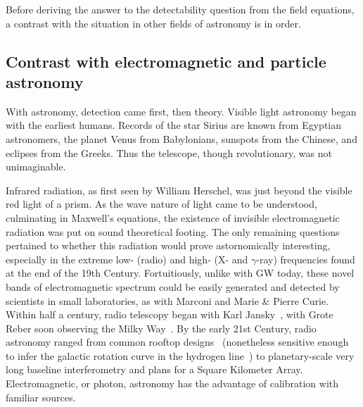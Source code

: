 Before deriving the answer to the detectability question from the field equations, a contrast with the situation in other fields of astronomy is in order.

 
        \subsection{Contrast with electromagnetic and particle astronomy}
        \label{contrast_astro}

        With astronomy, detection came first, then theory.
Visible light astronomy began with the earliest humans.
Records of the star Sirius are known from Egyptian astronomers, the planet Venus from Babylonians, sunspots from the Chinese, and eclipses from the Greeks. 
Thus the telescope, though revolutionary, was not unimaginable.

Infrared radiation, as first seen by William Herschel, was just beyond the visible red light of a prism.
As the wave nature of light came to be understood, culminating in Maxwell's equations, the existence of invisible electromagnetic radiation was put on sound theoretical footing.
The only remaining questions pertained to whether this radiation would prove astornomically interesting, especially in the extreme low- (radio) and high- (X- and $\gamma$-ray) frequencies found at the end of the 19th Century.
Fortuitiously, unlike with GW today, these novel bands of electromagnetic spectrum could be easily generated and detected by scientists in small laboratories, as with Marconi and Marie \& Pierre Curie.
Within half a century, radio telescopy began with Karl Jansky~\cite{Shklovsky1960}, with Grote Reber soon observing the Milky Way~\cite{Gurzadyan1956}.
By the early 21st Century, radio astronomy ranged from common rooftop designs~\cite{SRT} (nonetheless sensitive enough to infer the galactic rotation curve in the hydrogen line~\cite{MeadorsThesis2008}) to planetary-scale very long baseline interferometry and plans for a Square Kilometer Array.
Electromagnetic, or photon, astronomy has the advantage of calibration with familiar sources.



